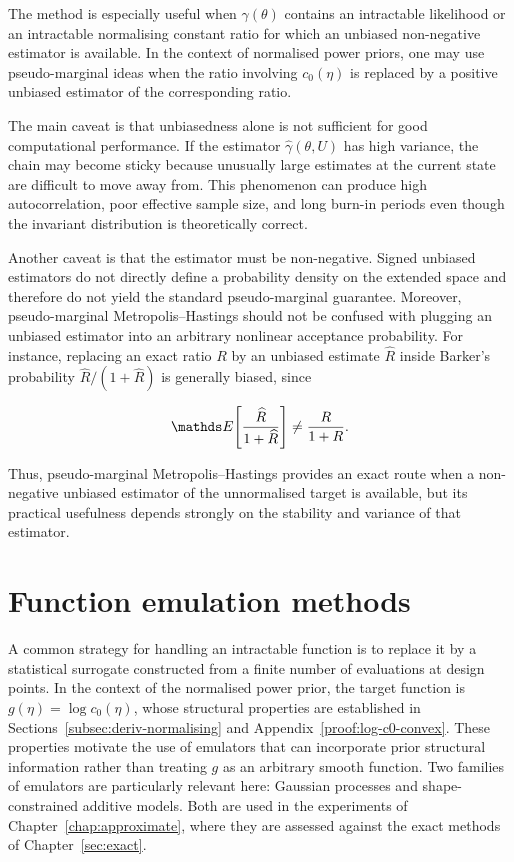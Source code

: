 The method is especially useful when $\gamma(\theta)$ contains an intractable likelihood or an intractable normalising constant ratio for which an unbiased non-negative estimator is available.
In the context of normalised power priors, one may use pseudo-marginal ideas when the ratio involving $c_0(\eta)$ is replaced by a positive unbiased estimator of the corresponding ratio.

The main caveat is that unbiasedness alone is not sufficient for good computational performance.
If the estimator $\widehat{\gamma}(\theta, U)$ has high variance, the chain may become sticky because unusually large estimates at the current state are difficult to move away from.
This phenomenon can produce high autocorrelation, poor effective sample size, and long burn-in periods even though the invariant distribution is theoretically correct.\

Another caveat is that the estimator must be non-negative.
Signed unbiased estimators do not directly define a probability density on the extended space and therefore do not yield the standard pseudo-marginal guarantee.
Moreover, pseudo-marginal Metropolis--Hastings should not be confused with plugging an unbiased estimator into an arbitrary nonlinear acceptance probability.
For instance, replacing an exact ratio $R$ by an unbiased estimate $\widehat{R}$ inside Barker's probability $\widehat{R}/(1+\widehat{R})$ is generally biased, since

\begin{equation*}
    \bE\qty[\frac{\widehat{R}}{1+\widehat{R}}]
    \neq
    \frac{R}{1+R}.
\end{equation*}

Thus, pseudo-marginal Metropolis--Hastings provides an exact route when a non-negative unbiased estimator of the unnormalised target is available, but its practical usefulness depends strongly on the stability and variance of that estimator.

\section{Function emulation methods}
\label{sec:function-emulation}

A common strategy for handling an intractable function is to replace it by a statistical surrogate constructed from a finite number of evaluations at design points.
In the context of the normalised power prior, the target function is $g(\eta) = \log c_0(\eta)$, whose structural properties are established in Sections~\ref{subsec:deriv-normalising} and Appendix~\ref{proof:log-c0-convex}.
These properties motivate the use of emulators that can incorporate prior structural information rather than treating $g$ as an arbitrary smooth function.
Two families of emulators are particularly relevant here: Gaussian processes and shape-constrained additive models.
Both are used in the experiments of Chapter~\ref{chap:approximate}, where they are assessed against the exact methods of Chapter~\ref{sec:exact}.

